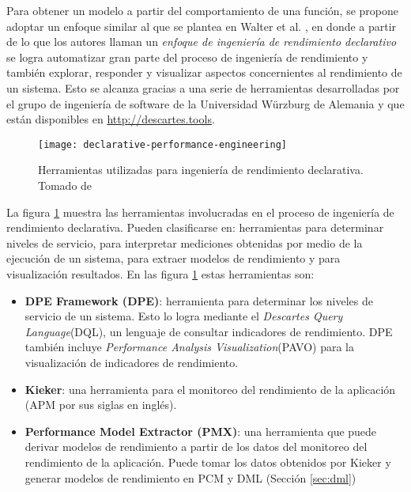 Para obtener un modelo a partir del comportamiento de una función, se propone adoptar un enfoque similar al que se plantea en Walter et al. \cite{Walter:2018:TDP:3185768.3185777}, en donde a partir de lo que los autores llaman un \emph{enfoque de ingeniería de rendimiento declarativo} se logra automatizar gran parte del proceso de ingeniería de rendimiento y también explorar, responder y visualizar aspectos concernientes al rendimiento de un sistema. Esto se alcanza gracias a una serie de herramientas desarrolladas por el grupo de ingeniería de software de la Universidad Würzburg de Alemania y que están disponibles en \url{http://descartes.tools}.

\begin{figure}[h]
  \centering
  \texttt{[image: declarative-performance-engineering]}
  \caption[Herramientas utilizadas para ingeniería de rendimiento declarativa]{Herramientas utilizadas para ingeniería de rendimiento declarativa. Tomado de \cite{Walter:2018:TDP:3185768.3185777}}
  \label{fig:declarative-performance-engineering}
\end{figure}

La figura \ref{fig:declarative-performance-engineering} muestra las herramientas involucradas en el proceso de ingeniería de rendimiento declarativa. Pueden clasificarse en: herramientas para determinar niveles de servicio, para interpretar mediciones obtenidas por medio de la ejecución de un sistema, para extraer modelos de rendimiento y para visualización resultados. En las figura \ref{fig:declarative-performance-engineering} estas herramientas son:
\begin{itemize}
    \item \textbf{DPE Framework (DPE)}: herramienta para determinar los niveles de servicio de un sistema. Esto lo logra mediante el \emph{Descartes Query Language}(DQL), un lenguaje de consultar indicadores de rendimiento. DPE también incluye \emph{Performance Analysis Visualization}(PAVO) para la visualización de indicadores de rendimiento.
    \item \textbf{Kieker}: una herramienta para el monitoreo del rendimiento de la aplicación (APM por sus siglas en inglés). 
    \item \textbf{Performance Model Extractor (PMX)}: una herramienta que puede derivar modelos de rendimiento a partir de los datos del monitoreo del rendimiento de la aplicación. Puede tomar los datos obtenidos por Kieker y generar modelos de rendimiento en PCM y DML (Sección \ref{sec:dml})
\end{itemize}

